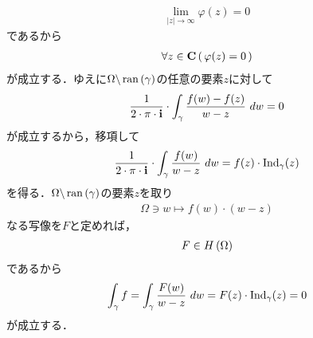 \begin{sketch}[大雑把]
\begin{align}
			\lim_{|z| \longrightarrow \infty} \varphi(z) = 0 
		\end{align}
		であるから
		\begin{align}
			\forall z \in \mathbf{C}\, (\, \varphi(z) = 0\, )
		\end{align}
		が成立する．ゆえに$\Omega \backslash \operatorname*{ran} \left(\gamma\right)$の任意の要素$z$に対して
		\begin{align}
			\frac{1}{2\cdot\pi\cdot\mathbf{i}} \cdot \int_{\gamma} \frac{f(w)-f(z)}{w-z}\ dw = 0
		\end{align}
		が成立するから，移項して
		\begin{align}
			\frac{1}{2\cdot\pi\cdot\mathbf{i}} \cdot \int_{\gamma} \frac{f(w)}{w-z}\ dw
			= f(z) \cdot \operatorname{Ind}_{\gamma}(z)
		\end{align}
		を得る．$\Omega \backslash \operatorname*{ran} \left(\gamma\right)$の要素$z$を取り
		\begin{align}
			\Omega \ni w \longmapsto f(w) \cdot (w - z)
		\end{align}
		なる写像を$F$と定めれば，
		\begin{align}
			F \in H\left(\Omega\right)
		\end{align}
		であるから
		\begin{align}
			\int_{\gamma} f = \int_{\gamma} \frac{F(w)}{w-z}\ dw = F(z) \cdot \operatorname{Ind}_{\gamma}(z) = 0
		\end{align}
		が成立する．
		\QED
	\end{sketch}